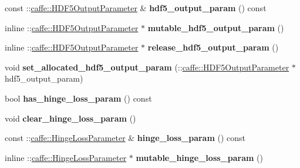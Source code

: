 \begin{DoxyCompactItemize}
\mbox{\label{classcaffe_1_1_layer_parameter_a98ae5bce3a3e4919c1aa6d915ae376a7}} 
const \+::\mbox{\hyperlink{classcaffe_1_1_h_d_f5_output_parameter}{caffe\+::\+H\+D\+F5\+Output\+Parameter}} \& {\bfseries hdf5\+\_\+output\+\_\+param} () const
\item 
\mbox{\label{classcaffe_1_1_layer_parameter_a6a2840387e2fbc0f1e8cec1e697ad868}} 
inline \+::\mbox{\hyperlink{classcaffe_1_1_h_d_f5_output_parameter}{caffe\+::\+H\+D\+F5\+Output\+Parameter}} $\ast$ {\bfseries mutable\+\_\+hdf5\+\_\+output\+\_\+param} ()
\item 
\mbox{\label{classcaffe_1_1_layer_parameter_a954261f97a8b9f26df6c4618bd206c32}} 
inline \+::\mbox{\hyperlink{classcaffe_1_1_h_d_f5_output_parameter}{caffe\+::\+H\+D\+F5\+Output\+Parameter}} $\ast$ {\bfseries release\+\_\+hdf5\+\_\+output\+\_\+param} ()
\item 
\mbox{\label{classcaffe_1_1_layer_parameter_aa545485ab8c93aa0f38f1dbf3bbcedc3}} 
void {\bfseries set\+\_\+allocated\+\_\+hdf5\+\_\+output\+\_\+param} (\+::\mbox{\hyperlink{classcaffe_1_1_h_d_f5_output_parameter}{caffe\+::\+H\+D\+F5\+Output\+Parameter}} $\ast$hdf5\+\_\+output\+\_\+param)
\item 
\mbox{\label{classcaffe_1_1_layer_parameter_a4cbbcf8230181dbcc96a3ce386c448c6}} 
bool {\bfseries has\+\_\+hinge\+\_\+loss\+\_\+param} () const
\item 
\mbox{\label{classcaffe_1_1_layer_parameter_a194775a44243b15c57fdf7558e26e65b}} 
void {\bfseries clear\+\_\+hinge\+\_\+loss\+\_\+param} ()
\item 
\mbox{\label{classcaffe_1_1_layer_parameter_a2a5b514691cad7908aed179f8b08c7fb}} 
const \+::\mbox{\hyperlink{classcaffe_1_1_hinge_loss_parameter}{caffe\+::\+Hinge\+Loss\+Parameter}} \& {\bfseries hinge\+\_\+loss\+\_\+param} () const
\item 
\mbox{\label{classcaffe_1_1_layer_parameter_a33898293a1de7f180a6ef4ae0871b4ed}} 
inline \+::\mbox{\hyperlink{classcaffe_1_1_hinge_loss_parameter}{caffe\+::\+Hinge\+Loss\+Parameter}} $\ast$ {\bfseries mutable\+\_\+hinge\+\_\+loss\+\_\+param} ()

\end{DoxyCompactItemize}
